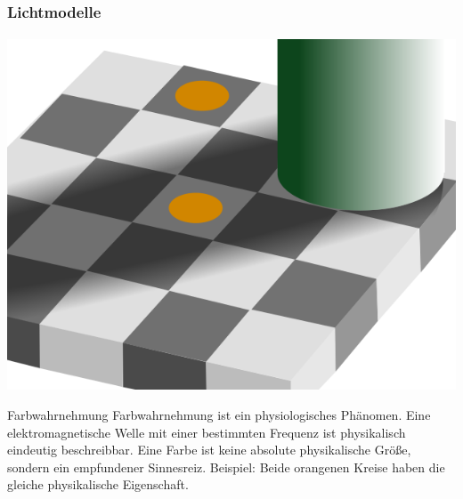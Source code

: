 \documentclass{beamer}
\begin{document}
\begin{frame}
    \frametitle{Lichtmodelle}
\framesubtitle{}
\begin{center}
\includegraphics[scale=0.225]{images/subjektivefarbwahrnehmung}
\end{center}
    \begin{block}{Farbwahrnehmung}
Farbwahrnehmung  ist ein physiologisches Phänomen. Eine elektromagnetische Welle mit
einer bestimmten Frequenz ist physikalisch eindeutig beschreibbar. Eine Farbe ist keine
absolute physikalische Größe, sondern ein empfundener Sinnesreiz. Beispiel: Beide orangenen Kreise haben die gleiche physikalische Eigenschaft.
\end{block}
\end{frame}
\end{document}
